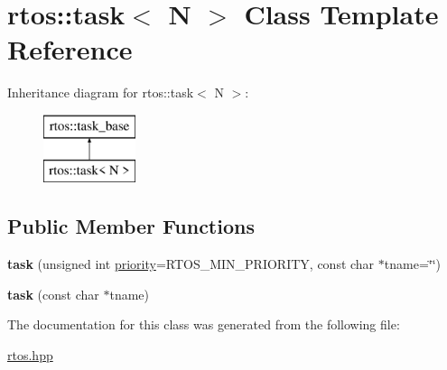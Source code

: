 \hypertarget{classrtos_1_1task}{}\section{rtos\+:\+:task$<$ N $>$ Class Template Reference}
\label{classrtos_1_1task}
Inheritance diagram for rtos\+:\+:task$<$ N $>$\+:\begin{figure}[H]
\begin{center}
\leavevmode
\includegraphics[height=2.000000cm]{classrtos_1_1task}
\end{center}
\end{figure}
\subsection*{Public Member Functions}
\begin{DoxyCompactItemize}
\item 
{\bfseries task} (unsigned int \hyperlink{classrtos_1_1task__base_a7c9b75a929b0d2ccceb440d6d9e5ba6a}{priority}=R\+T\+O\+S\+\_\+\+M\+I\+N\+\_\+\+P\+R\+I\+O\+R\+I\+TY, const char $\ast$tname=\char`\"{}\char`\"{})\hypertarget{classrtos_1_1task_a36f4e4a5aa5bfbcf35df75858d4d5abd}{}\label{classrtos_1_1task_a36f4e4a5aa5bfbcf35df75858d4d5abd}

\item 
{\bfseries task} (const char $\ast$tname)\hypertarget{classrtos_1_1task_a524617b96daa37e19fe438ec4eb866f0}{}\label{classrtos_1_1task_a524617b96daa37e19fe438ec4eb866f0}

\end{DoxyCompactItemize}


The documentation for this class was generated from the following file\+:\begin{DoxyCompactItemize}
\item 
\hyperlink{rtos_8hpp}{rtos.\+hpp}\end{DoxyCompactItemize}
